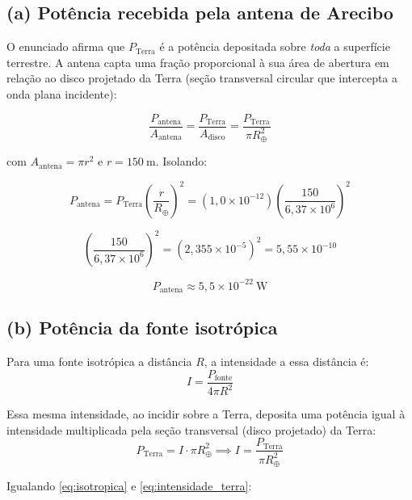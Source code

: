 \documentclass[12pt,a4paper]{article}
\begin{document}
\subsection*{(a) Potência recebida pela antena de Arecibo}

O enunciado afirma que $P_\text{Terra}$ é a potência depositada sobre
\emph{toda} a superfície terrestre. A antena capta uma fração
proporcional à sua área de abertura em relação ao disco projetado
da Terra (seção transversal circular que intercepta a onda plana
incidente):

\begin{equation}
    \frac{P_\text{antena}}{A_\text{antena}}
    =
    \frac{P_\text{Terra}}{A_\text{disco}}
    =
    \frac{P_\text{Terra}}{\pi R_\oplus^2}
    \label{eq:proporcao}
\end{equation}

com $A_\text{antena} = \pi r^2$ e $r = 150\ \text{m}$. Isolando:

\begin{equation}
    P_\text{antena}
    =
    P_\text{Terra}
    \left(\frac{r}{R_\oplus}\right)^2
    =
    (1{,}0\times10^{-12})
    \left(\frac{150}{6{,}37\times10^6}\right)^2
\end{equation}

\[
    \left(\frac{150}{6{,}37\times10^6}\right)^2
    = (2{,}355\times10^{-5})^2
    = 5{,}55\times10^{-10}
\]

\[
    \boxed{P_\text{antena} \approx 5{,}5\times10^{-22}\ \text{W}}
\]


\subsection*{(b) Potência da fonte isotrópica}

Para uma fonte isotrópica a distância $R$, a intensidade a essa
distância é:
\begin{equation}
    I = \frac{P_\text{fonte}}{4\pi R^2}
    \label{eq:isotropica}
\end{equation}

Essa mesma intensidade, ao incidir sobre a Terra, deposita uma potência
igual à intensidade multiplicada pela seção transversal (disco projetado)
da Terra:
\begin{equation}
    P_\text{Terra} = I \cdot \pi R_\oplus^2
    \implies
    I = \frac{P_\text{Terra}}{\pi R_\oplus^2}
    \label{eq:intensidade_terra}
\end{equation}

Igualando \eqref{eq:isotropica} e \eqref{eq:intensidade_terra}:
\end{document}
